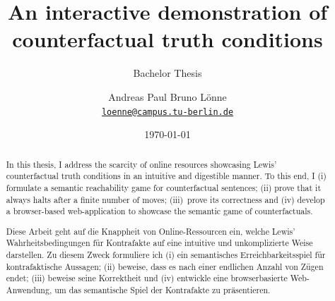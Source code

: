 \documentclass[a4paper,american,10pt]{paper}
\date{\today}
\providecommand*{\code}[1]{\texttt{#1}}
\theoremstyle{definition}\newtheorem{definition}{Definition}
\begin{document}
\title{An interactive demonstration of counterfactual truth conditions}

\subtitle{Bachelor Thesis}

\author{%
	Andreas Paul Bruno Lönne\\
	\code{\href{mailto:loenne@campus.tu-berlin.de}{loenne@campus.tu-berlin.de}}
}


\maketitle

\begin{abstract}
In this thesis, I address the scarcity of online resources showcasing Lewis' counterfactual truth conditions in an intuitive and digestible manner. To this end, I (i) formulate a semantic reachability game for counterfactual sentences; (ii) prove that it always halts after a finite number of moves; (iii)~prove its correctness and (iv) develop a browser-based web-application to showcase the semantic game of counterfactuals.
\end{abstract}
\begin{abstract}
Diese Arbeit geht auf die Knappheit von Online-Ressourcen ein, welche Lewis' Wahrheitsbedingungen für Kontrafakte auf eine intuitive und unkomplizierte Weise darstellen. Zu diesem Zweck formuliere ich (i) ein semantisches Erreichbarkeitsspiel für kontrafaktische Aussagen; (ii) beweise, dass es nach einer endlichen Anzahl von Zügen endet; (iii) beweise seine Korrektheit und (iv) entwickle eine browserbasierte Web-Anwendung, um das semantische Spiel der Kontrafakte zu präsentieren.
\end{abstract}
\newpage
\tableofcontents
\listoffigures
\newpage
\end{document}

